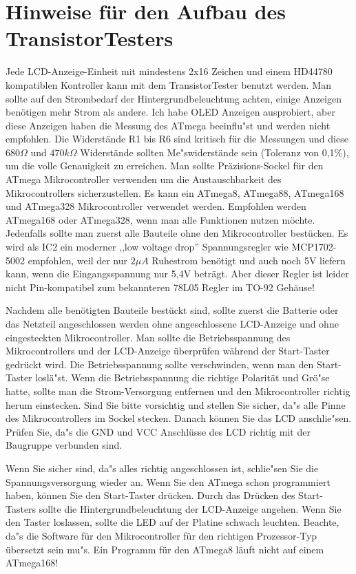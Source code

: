 \section{Hinweise f\"ur den Aufbau des TransistorTesters}
Jede LCD-Anzeige-Einheit mit mindestens 2x16 Zeichen und einem HD44780 kompatiblen Kontroller kann mit
dem TransistorTester benutzt werden.
Man sollte auf den Strombedarf der Hintergrundbeleuchtung achten, einige Anzeigen ben\"otigen
mehr Strom als andere.
Ich habe OLED Anzeigen ausprobiert, aber diese Anzeigen haben die Messung des
ATmega beeinflu"st und werden nicht empfohlen.
Die Widerst\"ande R1 bis R6 sind kritisch f\"ur die Messungen und diese \(680\Omega\) und
\(470k\Omega\) Widerst\"ande sollten Me"swiderst\"ande sein (Toleranz von 0,1\%), um 
die volle Genauigkeit zu erreichen.
Man sollte Pr\"azisions-Sockel f\"ur den ATmega Mikrocontroller verwenden um
die Austauschbarkeit des Mikrocontrollers sicherzustellen.
Es kann ein ATmega8, ATmega88, ATmega168 und ATmega328 Mikrocontroller verwendet werden.
Empfohlen werden ATmega168 oder ATmega328, wenn man alle Funktionen nutzen m\"ochte.
Jedenfalls sollte man zuerst alle Bauteile ohne den Mikrocontroller best\"ucken.
Es wird als IC2 ein moderner ,,low voltage drop'' Spannungsregler wie MCP1702-5002 empfohlen, weil
der nur \(2\mu A\) Ruhestrom ben\"otigt und auch noch 5V liefern kann, 
 wenn die Eingangsspannung nur 5,4V betr\"agt.
Aber dieser Regler ist leider nicht Pin-kompatibel zum bekannteren 78L05 Regler im TO-92 Geh\"ause!

Nachdem alle ben\"otigten Bauteile best\"uckt sind, sollte zuerst die Batterie
oder das Netzteil angeschlossen werden ohne angeschlossene LCD-Anzeige
und ohne eingesteckten Mikrocontroller.
Man sollte die Betriebsspannung des Mikrocontrollers und der LCD-Anzeige
\"uberpr\"ufen w\"ahrend der Start-Taster gedr\"uckt wird.
Die Betriebsspannung sollte verschwinden, wenn man den Start-Taster losl\"a"st.
Wenn die Betriebsspannung die richtige Polarit\"at und Gr\"o"se hatte,
sollte man die Strom-Versorgung entfernen und den Mikrocontroller 
richtig herum einstecken. Sind Sie bitte vorsichtig und stellen Sie sicher,
da"s alle Pinne des Mikrocontrollers im Sockel stecken.
Danach k\"onnen Sie das LCD anschlie"sen. Pr\"ufen Sie, da"s die GND und VCC
Anschl\"usse des LCD richtig mit der Baugruppe verbunden sind.

Wenn Sie sicher sind, da"s alles richtig angeschlossen ist, schlie"sen Sie
die Spannungsversorgung wieder an.
Wenn Sie den ATmega schon programmiert haben, k\"onnen Sie den Start-Taster
dr\"ucken.
Durch das Dr\"ucken des Start-Tasters sollte die Hintergrundbeleuchtung
der LCD-Anzeige angehen.
Wenn Sie den Taster loslassen, sollte die LED auf der Platine schwach leuchten.
Beachte, da"s die Software f\"ur den Mikrocontroller f\"ur den richtigen
Prozessor-Typ \"ubersetzt sein mu"s. Ein Programm f\"ur den ATmega8 l\"auft
nicht auf einem ATmega168!

